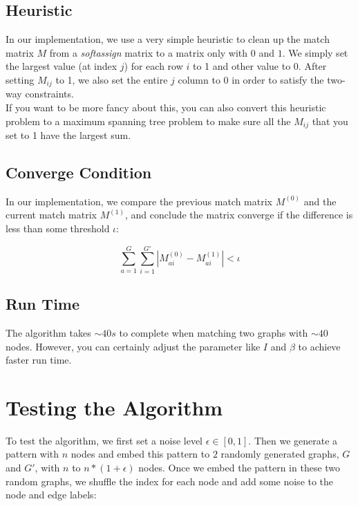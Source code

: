 \subsection{Heuristic}

In our implementation, we use a very simple heuristic to clean up the match matrix $M$ from a \emph{softassign} matrix to a matrix only with $0$ and $1$. We simply set the largest value (at index $j$) for each row $i$ to 1 and other value to 0. After setting $M_{ij}$ to 1, we also set the entire $j$ column to 0 in order to satisfy the two-way constraints.\\

If you want to be more fancy about this, you can also convert this heuristic problem to a maximum spanning tree problem to make sure all the $M_{ij}$ that you set to 1 have the largest sum.

\subsection{Converge Condition}

In our implementation, we compare the previous match matrix $M^{(0)}$ and the current match matrix $M^{(1)}$, and conclude the matrix converge if the difference is less than some threshold $\iota$:

\begin{equation} 
\sum_{a=1}^{G}\sum_{i=1}^{G'}|M_{ai}^{(0)}-M_{ai}^{(1)}|<\iota
\end{equation}

\subsection{Run Time}
\label{ssec:graphmatchingruntime}

The algorithm takes $\sim40s$ to complete when matching two graphs with $\sim40$ nodes. However, you can certainly adjust the parameter like $I$ and $\beta$ to achieve faster run time.

\section{Testing the Algorithm}
\label{sec:graphmatchingtest}

To test the algorithm, we first set a noise level $\epsilon \in [0,1]$. Then we generate a pattern with $n$ nodes and embed this pattern to $2$ randomly generated graphs, $G$ and $G'$, with $n$ to $n*(1+\epsilon)$ nodes. Once we embed the pattern in these two random graphs, we shuffle the index for each node and add some noise to the node and edge labels:

